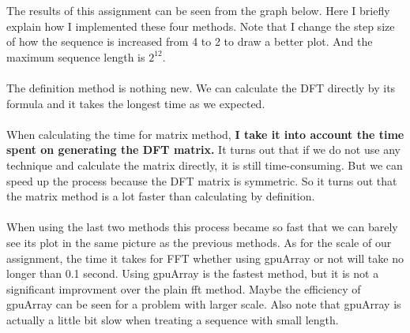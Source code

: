 \documentclass[12pt,letterpaper]{article}
\begin{document}
The results of this assignment can be seen from the graph below.
Here I briefly explain how I implemented these four methods.
Note that I change the step size of how the sequence is increased from 4 to 2 to draw a better plot.
And the maximum sequence length is $2^{12}$.\\
\\
The definition method is nothing new. 
We can calculate the DFT directly by its formula and it takes the longest time as we expected.\\
\\
When calculating the time for matrix method, \textbf{I take it into account the time spent on generating the DFT matrix.} 
It turns out that if we do not use any technique and calculate the matrix directly, it is still time-consuming.
But we can speed up the process because the DFT matrix is symmetric. 
So it turns out that the matrix method is a lot faster than calculating by definition.\\
\\
When using the last two methods this process became so fast that we can barely see its plot in the same picture as the previous methods. 
As for the scale of our assignment, the time it takes for FFT whether using gpuArray or not will take no longer than 0.1 second.
Using gpuArray is the fastest method, but it is not a significant improvment over the plain fft method. 
Maybe the efficiency of gpuArray can be seen for a problem with larger scale.
Also note that gpuArray is actually a little bit slow when treating a sequence with small length.
\end{document}

